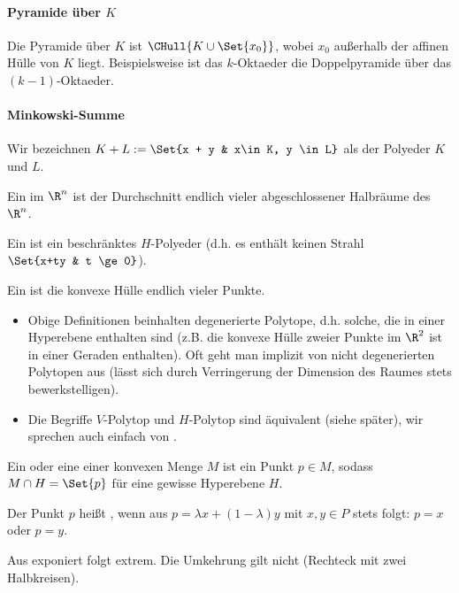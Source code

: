 \paragraph{Pyramide über $K$}
Die Pyramide über $K$ ist $\CHull{K \cup \Set{x_0}}$, wobei $x_0$ außerhalb der affinen Hülle von $K$ liegt.
Beispielsweise ist das $k$-Oktaeder die Doppelpyramide über das $(k-1)$-Oktaeder.

\paragraph{Minkowski-Summe}
Wir bezeichnen
\begin{math}
    K + L := \Set{x + y & x\in K, y \in L}
\end{math}
als  der Polyeder $K$ und $L$.

\begin{df}
    Ein  im $\R^n$ ist der Durchschnitt endlich vieler abgeschlossener Halbräume des $\R^n$.

    Ein  ist ein beschränktes $H$-Polyeder (d.h. es enthält keinen Strahl $\Set{x+ty & t \ge 0}$).
\end{df}

\begin{df}[$V$-Polytop]
    Ein  ist die konvexe Hülle endlich vieler Punkte.
\end{df}

\begin{note}
    \begin{itemize}
        \item
            Obige Definitionen beinhalten degenerierte Polytope, d.h. solche, die in einer Hyperebene enthalten sind (z.B. die konvexe Hülle zweier Punkte im $\R^2$ ist in einer Geraden enthalten).
            Oft geht man implizit von nicht degenerierten Polytopen aus (lässt sich durch Verringerung der Dimension des Raumes stets bewerkstelligen).
        \item
            Die Begriffe $V$-Polytop und $H$-Polytop sind äquivalent (siehe später), wir sprechen auch einfach von .
    \end{itemize}
\end{note}

\begin{df}
    Ein  oder eine  einer konvexen Menge $M$ ist ein Punkt $p \in M$, sodass $M \cap H = \Set{p}$ für eine gewisse Hyperebene $H$.

    Der Punkt $p$ heißt , wenn aus $p = \lambda x + (1-\lambda)y$ mit $x,y \in P$ stets folgt: $p = x$ oder $p = y$.
    \begin{note}
        Aus exponiert folgt extrem.
        Die Umkehrung gilt nicht (Rechteck mit zwei Halbkreisen).
    \end{note}
\end{df}

